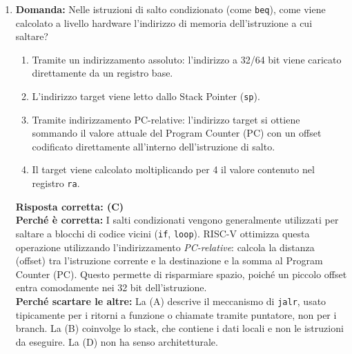 \documentclass[12pt, a4paper]{article}
\begin{document}
\begin{enumerate}
    \item \textbf{Domanda:} Nelle istruzioni di salto condizionato (come \texttt{beq}), come viene calcolato a livello hardware l'indirizzo di memoria dell'istruzione a cui saltare?
    \begin{enumerate}[label=(\Alph*)]
        \item Tramite un indirizzamento assoluto: l'indirizzo a 32/64 bit viene caricato direttamente da un registro base.
        \item L'indirizzo target viene letto dallo Stack Pointer (\texttt{sp}).
        \item Tramite indirizzamento PC-relative: l'indirizzo target si ottiene sommando il valore attuale del Program Counter (PC) con un offset codificato direttamente all'interno dell'istruzione di salto.
        \item Il target viene calcolato moltiplicando per 4 il valore contenuto nel registro \texttt{ra}.
    \end{enumerate}
    \textbf{Risposta corretta: (C)} \\
    \textbf{Perché è corretta:} I salti condizionati vengono generalmente utilizzati per saltare a blocchi di codice vicini (\texttt{if}, \texttt{loop}). RISC-V ottimizza questa operazione utilizzando l'indirizzamento \textit{PC-relative}: calcola la distanza (offset) tra l'istruzione corrente e la destinazione e la somma al Program Counter (PC). Questo permette di risparmiare spazio, poiché un piccolo offset entra comodamente nei 32 bit dell'istruzione. \\
    \textbf{Perché scartare le altre:} La (A) descrive il meccanismo di \texttt{jalr}, usato tipicamente per i ritorni a funzione o chiamate tramite puntatore, non per i branch. La (B) coinvolge lo stack, che contiene i dati locali e non le istruzioni da eseguire. La (D) non ha senso architetturale.


\end{enumerate}
\end{document}
